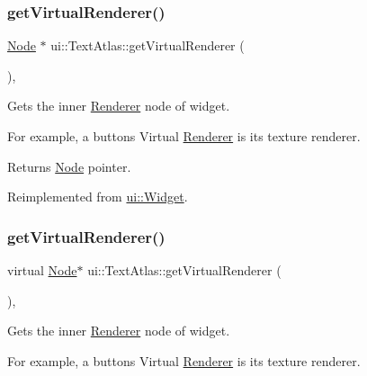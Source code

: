 \subsubsection{\texorpdfstring{get\+Virtual\+Renderer()}{getVirtualRenderer()}\hspace{0.1cm}{\footnotesize\ttfamily [1/2]}}
{\footnotesize\ttfamily \hyperlink{classNode}{Node} $\ast$ ui\+::\+Text\+Atlas\+::get\+Virtual\+Renderer (\begin{DoxyParamCaption}{ }\end{DoxyParamCaption})\hspace{0.3cm}{\ttfamily [override]}, {\ttfamily [virtual]}}

Gets the inner \hyperlink{classRenderer}{Renderer} node of widget.

For example, a button\textquotesingle{}s Virtual \hyperlink{classRenderer}{Renderer} is it\textquotesingle{}s texture renderer.

\begin{DoxyReturn}{Returns}
\hyperlink{classNode}{Node} pointer. 
\end{DoxyReturn}


Reimplemented from \hyperlink{classui_1_1Widget_acf862bf9235fbb3823819eeb65d46f25}{ui\+::\+Widget}.

\mbox{\label{classui_1_1TextAtlas_ad507ef83a1b5570819a24afe337d2835}} 
\subsubsection{\texorpdfstring{get\+Virtual\+Renderer()}{getVirtualRenderer()}\hspace{0.1cm}{\footnotesize\ttfamily [2/2]}}
{\footnotesize\ttfamily virtual \hyperlink{classNode}{Node}$\ast$ ui\+::\+Text\+Atlas\+::get\+Virtual\+Renderer (\begin{DoxyParamCaption}{ }\end{DoxyParamCaption})\hspace{0.3cm}{\ttfamily [override]}, {\ttfamily [virtual]}}

Gets the inner \hyperlink{classRenderer}{Renderer} node of widget.

For example, a button\textquotesingle{}s Virtual \hyperlink{classRenderer}{Renderer} is it\textquotesingle{}s texture renderer.

